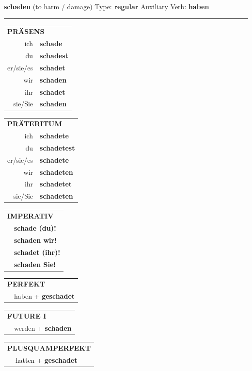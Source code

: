 \documentclass[10pt,a4paper]{revtex4-2}
\begin{document}
\begin{verbbox}
{\Large \bf schaden} (to harm / damage) \hfill Type: \textbf{regular} \hfill Auxiliary Verb: \textbf{haben}

\vspace{5pt}
\hrule
\vspace{5pt}

\begin{tabular}{rl}
\multicolumn{2}{l}{\textbf{PRÄSENS}}\\
ich & \textbf{schade}\\
du & \textbf{schadest}\\
er/sie/es & \textbf{schadet}\\
wir & \textbf{schaden}\\
ihr & \textbf{schadet}\\
sie/Sie & \textbf{schaden}\\
\end{tabular}
\hfill
\begin{tabular}{rl}
\multicolumn{2}{l}{\textbf{PRÄTERITUM}}\\
ich & \textbf{schadete}\\
du & \textbf{schadetest}\\
er/sie/es & \textbf{schadete}\\
wir & \textbf{schadeten}\\
ihr & \textbf{schadetet}\\
sie/Sie & \textbf{schadeten}\\
\end{tabular}
\hfill
\begin{tabular}{rl}
\multicolumn{2}{l}{\textbf{IMPERATIV}}\\
& \textbf{schade (du)!}\\
& \textbf{schaden wir!}\\
& \textbf{schadet (ihr)!}\\
& \textbf{schaden Sie!}\\
\end{tabular}

\vspace{10pt}

\begin{tabular}{rl}
\multicolumn{2}{l}{\textbf{PERFEKT}}\\
& haben + \textbf{geschadet}\\
\end{tabular}
\hfill
\begin{tabular}{rl}
\multicolumn{2}{l}{\textbf{FUTURE I}}\\
& werden + \textbf{schaden}\\
\end{tabular}
\hfill
\begin{tabular}{rl}
\multicolumn{2}{l}{\textbf{PLUSQUAMPERFEKT}}\\
& hatten + \textbf{geschadet}\\
\end{tabular}


\end{verbbox}
\end{document}
